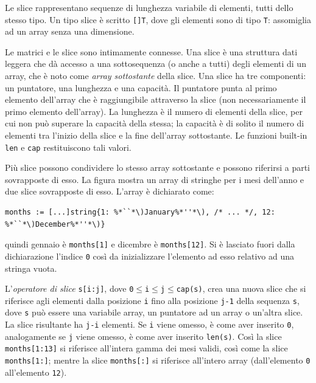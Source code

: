 %
Le slice rappresentano sequenze di lunghezza variabile di elementi, tutti dello stesso tipo.
Un tipo slice è scritto \verb|[]T|, dove gli elementi sono di tipo \verb|T|: assomiglia ad un array senza una dimensione.

Le matrici e le slice sono intimamente connesse.
Una slice è una struttura dati leggera che dà accesso a una sottosequenza (o anche a tutti) degli elementi di un array, che è noto come \textit{array sottostante} della slice.
Una slice ha tre componenti: un puntatore, una lunghezza e una capacità.
Il puntatore punta al primo elemento dell'array che è raggiungibile attraverso la slice (non necessariamente il primo elemento dell'array).
La lunghezza è il numero di elementi della slice, per cui non può superare la capacità della stessa;
la capacità è di solito il numero di elementi tra l'inizio della slice e la fine dell'array sottostante.
Le funzioni built-in \verb|len| e \verb|cap| restituiscono tali valori.

Più slice possono condividere lo stesso array sottostante e possono riferirsi a parti sovrapposte di esso.
La figura mostra un array di stringhe per i mesi dell'anno e due slice sovrapposte di esso.
L'array è dichiarato come:
\begin{lstlisting}[label={lst:lstlisting3-2.1}]
months := [...]string{1: %*``*\)January%*''*\), /* ... */, 12: %*``*\)December%*''*\)}
\end{lstlisting}
quindi gennaio è \verb|months[1]| e dicembre è \verb|months[12]|.
Si è lasciato fuori dalla dichiarazione l'indice \verb|0| così da inizializzare l'elemento ad esso relativo ad una stringa vuota.

L'\textit{operatore di slice} \verb|s[i:j]|, dove \verb|0|$\le$\verb|i|$\le$\verb|j|$\le$\verb|cap(s)|, crea una nuova slice che si riferisce agli elementi dalla posizione \verb|i| fino alla posizione \verb|j-1| della sequenza \verb|s|, dove \verb|s| può essere una variabile array, un puntatore ad un array o un'altra slice.
La slice risultante ha \verb|j-i| elementi.
Se \verb|i| viene omesso, è come aver inserito \verb|0|, analogamente se \verb|j| viene omesso, è come aver inserito \verb|len(s)|.
Così la slice \verb|months[1:13]| si riferisce all'intera gamma dei mesi validi, così come la slice \verb|months[1:]|;
mentre la slice \verb|months[:]| si riferisce all'intero array (dall'elemento \verb|0| all'elemento \verb|12|).

